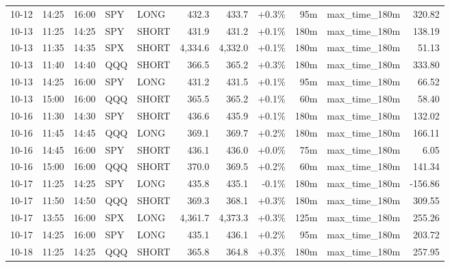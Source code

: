 \documentclass[11pt,a4paper,twoside]{article}
\begin{document}
\begin{center}
\begin{longtable}{>{\color{txtmain}}l l l l l r r r r >{\color{txtmain}}l r}
10-12 & 14:25 & 16:00 & SPY & LONG & 432.3 & 433.7 & \textcolor{wingreen}{+0.3\%} & 95m & max\_time\_180m & \textcolor{wingreen}{320.82} \\
10-13 & 11:25 & 14:25 & SPY & SHORT & 431.9 & 431.2 & \textcolor{wingreen}{+0.1\%} & 180m & max\_time\_180m & \textcolor{wingreen}{138.19} \\
10-13 & 11:35 & 14:35 & SPX & SHORT & 4,334.6 & 4,332.0 & \textcolor{wingreen}{+0.1\%} & 180m & max\_time\_180m & \textcolor{wingreen}{51.13} \\
10-13 & 11:40 & 14:40 & QQQ & SHORT & 366.5 & 365.2 & \textcolor{wingreen}{+0.3\%} & 180m & max\_time\_180m & \textcolor{wingreen}{333.80} \\
10-13 & 14:25 & 16:00 & SPY & LONG & 431.2 & 431.5 & \textcolor{wingreen}{+0.1\%} & 95m & max\_time\_180m & \textcolor{wingreen}{66.52} \\
10-13 & 15:00 & 16:00 & QQQ & SHORT & 365.5 & 365.2 & \textcolor{wingreen}{+0.1\%} & 60m & max\_time\_180m & \textcolor{wingreen}{58.40} \\
10-16 & 11:30 & 14:30 & SPY & SHORT & 436.6 & 435.9 & \textcolor{wingreen}{+0.1\%} & 180m & max\_time\_180m & \textcolor{wingreen}{132.02} \\
10-16 & 11:45 & 14:45 & QQQ & LONG & 369.1 & 369.7 & \textcolor{wingreen}{+0.2\%} & 180m & max\_time\_180m & \textcolor{wingreen}{166.11} \\
10-16 & 14:45 & 16:00 & SPY & SHORT & 436.1 & 436.0 & \textcolor{wingreen}{+0.0\%} & 75m & max\_time\_180m & \textcolor{wingreen}{6.05} \\
10-16 & 15:00 & 16:00 & QQQ & SHORT & 370.0 & 369.5 & \textcolor{wingreen}{+0.2\%} & 60m & max\_time\_180m & \textcolor{wingreen}{141.34} \\
10-17 & 11:25 & 14:25 & SPY & LONG & 435.8 & 435.1 & \textcolor{lossred}{-0.1\%} & 180m & max\_time\_180m & \textcolor{lossred}{-156.86} \\
10-17 & 11:50 & 14:50 & QQQ & SHORT & 369.3 & 368.1 & \textcolor{wingreen}{+0.3\%} & 180m & max\_time\_180m & \textcolor{wingreen}{309.55} \\
10-17 & 13:55 & 16:00 & SPX & LONG & 4,361.7 & 4,373.3 & \textcolor{wingreen}{+0.3\%} & 125m & max\_time\_180m & \textcolor{wingreen}{255.26} \\
10-17 & 14:25 & 16:00 & SPY & LONG & 435.1 & 436.1 & \textcolor{wingreen}{+0.2\%} & 95m & max\_time\_180m & \textcolor{wingreen}{203.72} \\
10-18 & 11:25 & 14:25 & QQQ & SHORT & 365.8 & 364.8 & \textcolor{wingreen}{+0.3\%} & 180m & max\_time\_180m & \textcolor{wingreen}{257.95} \\

\end{longtable}
\end{center}
\end{document}
